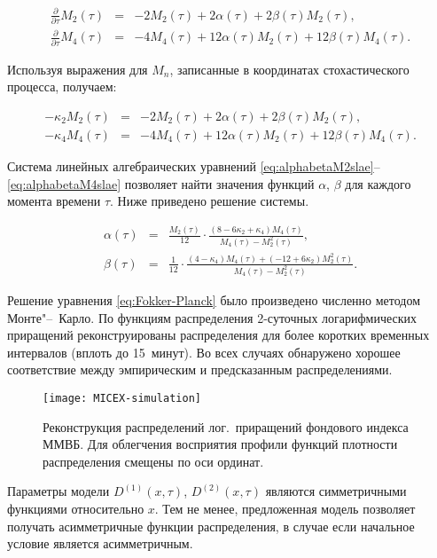 \documentclass{mce-article}
\begin{document}
\begin{eqnarray}
  \frac{\partial}{\partial \tau} M_2(\tau)
  &=& -2 M_2(\tau) + 2 \alpha(\tau) + 2 \beta(\tau) M_2(\tau),\\
  \frac{\partial}{\partial \tau} M_4(\tau)
  &=& -4 M_4(\tau) + 12 \alpha(\tau) M_2(\tau)
  + 12 \beta(\tau) M_4(\tau).
\end{eqnarray}

Используя выражения для $M_n$, записанные в координатах
стохастического процесса, получаем:

\begin{eqnarray}
  \label{eq:alphabetaM2slae}
  - \kappa_2 M_2(\tau) &=& -2 M_2(\tau) +  2 \alpha(\tau)
  +  2 \beta(\tau) M_2(\tau),\\
  \label{eq:alphabetaM4slae}
  - \kappa_4 M_4(\tau) &=& -4 M_4(\tau) + 12 \alpha(\tau) M_2(\tau)
  + 12 \beta(\tau) M_4(\tau).
\end{eqnarray}

Система линейных алгебраических уравнений
\eqref{eq:alphabetaM2slae}--\eqref{eq:alphabetaM4slae} позволяет найти
значения функций $\alpha$, $\beta$ для каждого момента времени $\tau$.
Ниже приведено решение системы.

\begin{eqnarray}
  \alpha(\tau) &=& \frac{M_2(\tau)}{12}
  \cdot \frac{(8 - 6 \kappa_2 + \kappa_4) M_4(\tau)}
  {M_4(\tau) - M_2^2(\tau)},\\
  \beta(\tau) &=& \frac{1}{12}
  \cdot \frac{(4 - \kappa_4) M_4(\tau)
    + (-12 + 6 \kappa_2) M_2^2(\tau)}
  {M_4(\tau) - M_2^2(\tau)}.
\end{eqnarray}

Решение уравнения \eqref{eq:Fokker-Planck} было произведено численно
методом Монте"--~Карло. По функциям распределения 2-суточных
логарифмических приращений реконструированы распределения для более
коротких временных интервалов (вплоть до 15~минут). Во всех случаях
обнаружено хорошее соответствие между эмпирическим и предсказанным
распределениями.

\begin{figure}
  \centering
  \texttt{[image: MICEX-simulation]}
  \caption{Реконструкция распределений лог.~приращений фондового
    индекса ММВБ. Для облегчения восприятия профили функций плотности
    распределения смещены по оси ординат.}
\end{figure}

Параметры модели $D^{(1)}(x, \tau)$, $D^{(2)}(x, \tau)$ являются
симметричными функциями относительно $x$. Тем не менее, предложенная
модель позволяет получать асимметричные функции распределения, в
случае если начальное условие является асимметричным.
\end{document}
